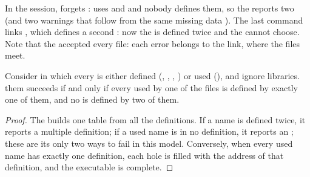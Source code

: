 \label{out:b1:compilation-pipeline:linking}

\begin{example}\label{ex:b1:compilation-pipeline:link-errors}
In the session,  forgets :  uses  and
 and nobody defines them, so the  reports two  (and two warnings
that follow from the same missing data ). The last command links , which defines a second
: now the  is defined twice and the  cannot choose. Note that the  accepted
every file: each error belongs to the link, where the files meet.
\end{example}

\begin{proposition}\label{prop:b1:compilation-pipeline:link}
Consider  in which every  is either defined (, , , ) or used
(), and ignore libraries.  them succeeds if and only if every  used by one of the files is
defined by exactly one of them, and no  is defined by two of them.
\end{proposition}

\begin{proof}
The  builds one table from all the definitions. If a name is defined twice, it reports a multiple
definition; if a used name is in no definition, it reports an ; these are its only two ways
to fail in this model. Conversely, when every used name has exactly one definition, each hole is filled with
the address of that definition, and the executable is complete.
\end{proof}

